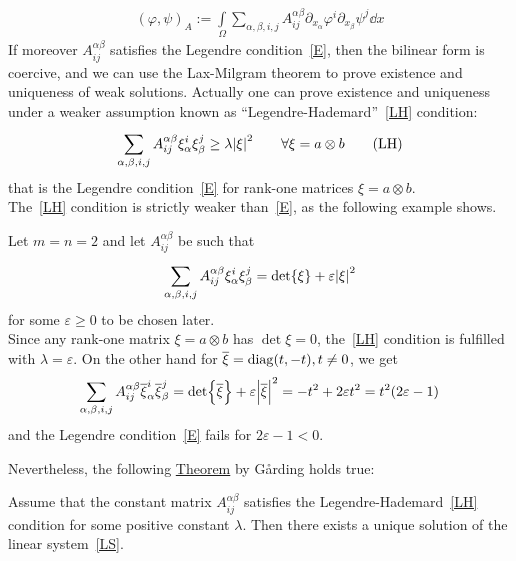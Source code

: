 \begin{gather}
	{(\varphi,\psi)}_A := \int\limits_{\Omega}^{} \sum_{\alpha, \beta, i,j}^{} A_{ij}^{\alpha \beta} \partial_{x_{\alpha}} \varphi^{i} \partial_{x_{\beta}} \psi^{j} \dd{x}
\end{gather}
If moreover \(A_{ij}^{\alpha \beta}\) satisfies the Legendre condition~\eqref{E}, then the bilinear form is coercive, and we can use the Lax-Milgram theorem to prove existence and uniqueness of weak solutions. Actually one can prove existence and uniqueness under a weaker assumption known as \enquote{Legendre-Hademard}~\eqref{LH} condition:
\begin{gather}
	\sum_{\alpha,\beta,i,j}^{} A_{ij}^{\alpha \beta} \xi_{\alpha}^{i} \xi_{\beta}^{j}\geq \lambda \abs{\xi}^{2} \qquad \forall \xi=a \otimes b \tag{LH} \label{LH}
\end{gather}
that is the Legendre condition~\eqref{E} for rank-one matrices \(\xi=a\otimes b\).\\
The~\eqref{LH} condition is strictly weaker than~\eqref{E}, as the following example shows.

\begin{exm}
	Let \(m=n=2\) and let \(A_{ij}^{\alpha \beta}\) be such that
	\begin{gather}
		\sum_{\alpha, \beta, i,j}^{}  A_{ij}^{\alpha \beta} \xi_{\alpha}^{i} \xi_{\beta}^{j} = \det{\xi} + \varepsilon \abs{\xi}^{2}
	\end{gather}
	for some \(\varepsilon \geq 0\) to be chosen later.\\
	Since any rank-one matrix \(\xi = a \otimes b\) has \(\det{\xi}=0\), the~\eqref{LH} condition is fulfilled with \(\lambda = \varepsilon \). On the other hand for \(\overline{\xi} = \operatorname{diag}(t,-t), t \neq 0\), we get
	\begin{gather}
		\sum_{\alpha, \beta, i,j}^{}  A_{ij}^{\alpha \beta} \overline{\xi}_{\alpha}^{i} \overline{\xi}_{\beta}^{j} = \det{\overline{\xi}} + \varepsilon \abs{\overline{\xi}}^{2} = -t^{2}+2 \varepsilon t^{2} = t^{2}(2 \varepsilon -1)
	\end{gather}
	and the Legendre condition~\eqref{E} fails for \(2 \varepsilon-1 <0\).
\end{exm}
Nevertheless, the following \underline{Theorem} by G\r{a}rding holds true:
\begin{thm}
	Assume that the constant matrix \(A_{ij}^{\alpha \beta}\) satisfies the Legendre-Hademard~\eqref{LH} condition for some positive constant \(\lambda \). Then there exists a unique solution of the linear system~\eqref{LS}.
\end{thm}


